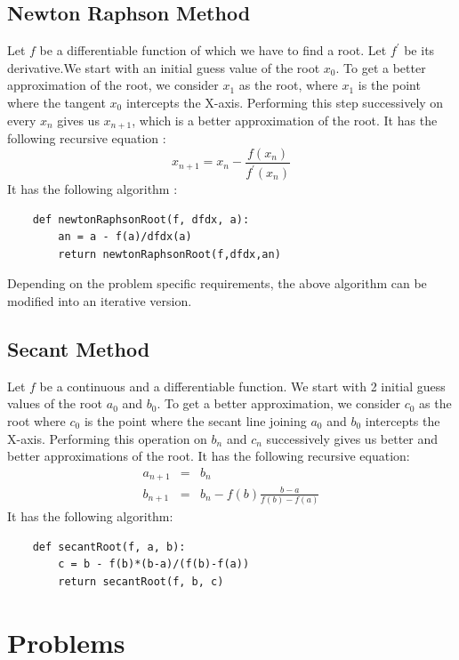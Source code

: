 \documentclass[12,a4paper]{article}
\begin{document}
    \subsection{Newton Raphson Method}
    Let $f$ be a differentiable function of which we have to find a root. Let $f^{'}$ be its derivative.We start with an initial guess value of the root $x_0$. To get a better approximation of the root, we consider $x_1$ as the root, where $x_1$ is the point where the tangent $x_0$ intercepts the X-axis. Performing this step successively on every $x_n$ gives us $x_{n+1}$, which is a better approximation of the root. It has the following recursive equation :
    \begin{equation}
        x_{n+1} = x_n - \frac{f(x_n)}{f^{'}\left(x_n\right)}
    \end{equation}
    It has the following algorithm :
    \begin{lstlisting}
    def newtonRaphsonRoot(f, dfdx, a):
        an = a - f(a)/dfdx(a)
        return newtonRaphsonRoot(f,dfdx,an)
    \end{lstlisting}
    Depending on the problem specific requirements, the above algorithm can be modified into an iterative version.
    \subsection{Secant Method}
    Let $f$ be a continuous and a differentiable function. We start with 2 initial guess values of the root $a_0$ and $b_0$. To get a better approximation, we consider $c_0$ as the root where $c_0$ is the point where the secant line joining $a_0$ and $b_0$ intercepts the X-axis. Performing this operation on $b_n$ and $c_n$ successively gives us better and better approximations of the root. It has the following recursive equation:
    \begin{eqnarray}
        a_{n+1} &=& b_n \\
        b_{n+1} &=& b_n - f(b)\frac{b-a}{f(b)-f(a)}
    \end{eqnarray}
    It has the following algorithm:
    \begin{lstlisting}
    def secantRoot(f, a, b):
        c = b - f(b)*(b-a)/(f(b)-f(a))
        return secantRoot(f, b, c)
    \end{lstlisting}
    \newpage
    \section{Problems}
\end{document}
